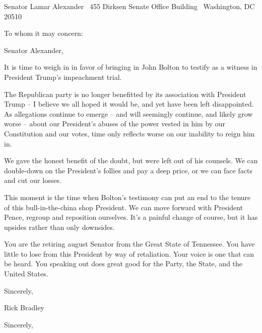 \documentclass{letter}
\begin{document}
\begin{letter}{Senator Lamar Alexander \ 455 Dirksen Senate Office Building \ Washington, DC 20510}
\opening{To whom it may concern:}
Senator Alexander,

It is time to weigh in in favor of bringing in John Bolton to testify as a witness in President Trump's impeachment trial.

The Republican party is no longer benefitted by its association with President Trump -- I believe we all hoped it would be, and yet have been left disappointed. As allegations continue to emerge -- and will seemingly continue, and likely grow worse -- about our President's abuses of the power vested in him by our Constitution and our votes, time only reflects worse on our inability to reign him in.

We gave the honest benefit of the doubt, but were left out of his counsels. We can double-down on the President's follies and pay a deep price, or we can face facts and cut our losses.

This moment is the time when Bolton's testimony can put an end to the tenure of this bull-in-the-china shop President. We can move forward with President Pence, regroup and reposition ourselves. It's a painful change of course, but it has upsides rather than only downsides.

You are the retiring august Senator from the Great State of Tennessee. You have little to lose from this President by way of retaliation. Your voice is one that can be heard. You speaking out does great good for the Party, the State, and the United States.

Sincerely,

Rick Bradley

\closing{Sincerely,}
\end{letter}
\end{document}
